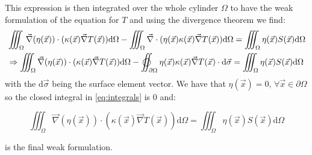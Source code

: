 This expression is then integrated over the whole cylinder $\Omega$ to have the weak formulation of the equation for $T$ and using the divergence theorem we find:
\begin{equation}
    \begin{aligned}
        & \iiint_\Omega \vec{\nabla}(\eta(\vec{x}))\cdot(\kappa(\vec{x})\vec{\nabla}T(\vec{x})) \mathrm{d}\Omega - \iiint_\Omega \vec{\nabla}\cdot(\eta(\vec{x})\kappa(\vec{x})\vec{\nabla}T(\vec{x})) \mathrm{d}\Omega = \iiint_\Omega \eta(\vec{x})S(\vec{x}) \mathrm{d}\Omega \\
        & \Rightarrow \iiint_\Omega \vec{\nabla}(\eta(\vec{x}))\cdot(\kappa(\vec{x})\vec{\nabla}T(\vec{x})) \mathrm{d}\Omega - \varoiint_{\partial\Omega} \eta(\vec{x})\kappa(\vec{x})\vec{\nabla}T(\vec{x}) \cdot \mathrm{d}\vec{\sigma} = \iiint_\Omega \eta(\vec{x})S(\vec{x}) \mathrm{d}\Omega
    \end{aligned}
    \label{eq:integrals}
\end{equation}
with the $\mathrm{d}\vec{\sigma}$ being the surface element vector. We have that $\eta(\vec{x}) = 0, \, \forall \vec{x} \in \partial\Omega$ so the closed integral in \autoref{eq:integrals} is 0 and:

\begin{equation}
    \iiint_\Omega \vec{\nabla}(\eta(\vec{x}))\cdot(\kappa(\vec{x})\vec{\nabla}T(\vec{x})) \mathrm{d}\Omega = \iiint_\Omega \eta(\vec{x})S(\vec{x}) \mathrm{d}\Omega
    \label{eq:weak_formulation}
\end{equation}

is the final weak formulation.


